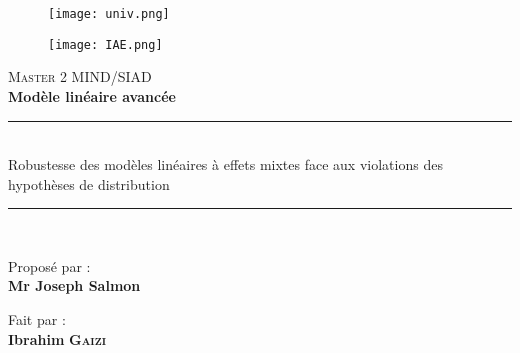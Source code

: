 \documentclass[french,12pt]{report}
\newcommand{\<}{\langle}
\renewcommand{\>}{\rangle}
\theoremstyle{definition}
\begin{document}
\begin{titlepage}

\begin{figure}
     \begin{minipage}{0.4\textwidth}
         \begin{flushleft}
             \texttt{[image: univ.png]}
             
         \end{flushleft}
     \end{minipage}
     \hfill
     \begin{minipage}{0.4\textwidth}
         \begin{flushright}
             \texttt{[image: IAE.png]}
          
         \end{flushright}
     \end{minipage}
\end{figure}


\vspace{4cm}

\center
\textsc{\LARGE Master 2 MIND/SIAD}\\
\vspace{1cm}
\textrm{\textbf{Modèle linéaire avancée}}

\rule{\linewidth}{1pt}\\[0.4cm]

\huge { Robustesse des modèles linéaires à effets mixtes face aux violations des hypothèses de distribution }
\rule{\linewidth}{1pt}\\[0.5cm]

 
 




\vspace{1cm}

\Large Proposé par : \\[0.5cm]

\LARGE \textbf{Mr Joseph Salmon}\\






     




 
\vspace{2cm}

\Large Fait par : \\[0.9cm]



\LARGE \textbf{Ibrahim} \textsc{ \textbf{Gaizi}}\\


\vspace{1cm}
     

\centering




     




\end{titlepage}
\end{document}
